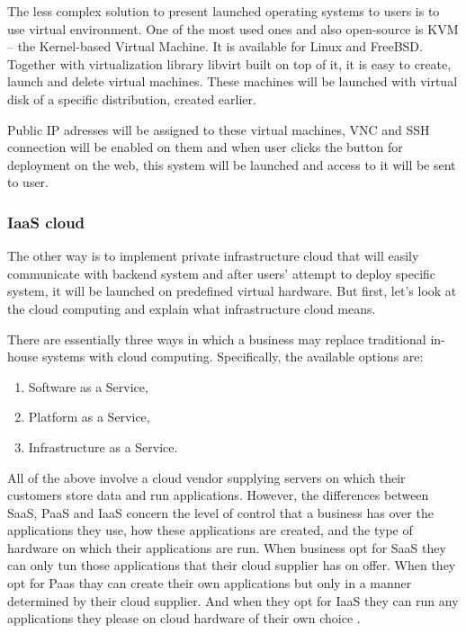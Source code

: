 \documentclass[thesis=B,english]{FITthesis}[2013/04/26]
\begin{document}
The less complex solution to present launched operating systems to users is to use virtual environment. One of the most used ones and also open-source is KVM -- the Kernel-based Virtual Machine. It is available for Linux and FreeBSD. Together with virtualization library libvirt built on top of it, it is easy to create, launch and delete virtual machines. These machines will be launched with virtual disk of a specific distribution, created earlier.

Public IP adresses will be assigned to these virtual machines, VNC and SSH connection will be enabled on them and when user clicks the button for deployment on the web, this system will be launched and access to it will be sent to user.

\subsubsection{IaaS cloud}

The other way is to implement private infrastructure cloud that will easily communicate with backend system and after users' attempt to deploy specific system, it will be launched on predefined virtual hardware. But first, let's look at the cloud computing and explain what infrastructure cloud means.

There are essentially three ways in which a business may replace traditional in-house systems with cloud computing. Specifically, the available options are:
\begin{enumerate}
	\item Software as a Service,
	\item Platform as a Service,
	\item Infrastructure as a Service.
\end{enumerate}

All of the above involve a cloud vendor supplying servers on which their customers store data and run applications. However, the differences between SaaS, PaaS and IaaS concern the level of control that a business has over the applications they use, how these applications are created, and the type of hardware on which their applications are run.
When business opt for SaaS they can only tun those applications that their cloud supplier has on offer. When they opt for Paas thay can create their own applications but only in a manner determined by their cloud supplier. And when they opt for IaaS they can run any applications they please on cloud hardware of their own choice \cite{cc_guide}.
\end{document}

